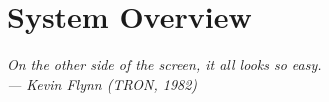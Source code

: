 \chapter{System Overview}\label{ch:sys-over}

\begin{flushright}{\slshape
     On the other side of the screen, it all looks so easy.\\ \medskip
     --- Kevin Flynn (TRON, 1982)}
\end{flushright}




